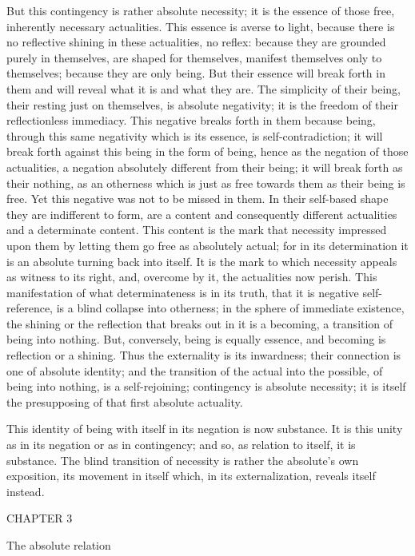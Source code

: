 But this contingency is rather absolute necessity;
it is the essence of those free, inherently necessary actualities.
This essence is averse to light,
because there is no reflective shining
in these actualities, no reflex:
because they are grounded purely in themselves,
are shaped for themselves,
manifest themselves only to themselves;
because they are only being.
But their essence will break forth in them
and will reveal what it is and what they are.
The simplicity of their being,
their resting just on themselves,
is absolute negativity;
it is the freedom of their reflectionless immediacy.
This negative breaks forth in them because being,
through this same negativity which is its essence,
is self-contradiction;
it will break forth against this
being in the form of being,
hence as the negation of those actualities,
a negation absolutely different from their being;
it will break forth as their nothing,
as an otherness which is just as free towards them
as their being is free.
Yet this negative was not to be missed in them.
In their self-based shape
they are indifferent to form,
are a content and consequently
different actualities
and a determinate content.
This content is the mark
that necessity impressed upon them
by letting them go free as absolutely actual;
for in its determination it is
an absolute turning back into itself.
It is the mark to which necessity appeals
as witness to its right,
and, overcome by it,
the actualities now perish.
This manifestation of what
determinateness is in its truth,
that it is negative self-reference,
is a blind collapse into otherness;
in the sphere of immediate existence,
the shining or the reflection
that breaks out in it is a becoming,
a transition of being into nothing.
But, conversely, being is equally essence,
and becoming is reflection or a shining.
Thus the externality is its inwardness;
their connection is one of absolute identity;
and the transition of the actual into the possible,
of being into nothing, is a self-rejoining;
contingency is absolute necessity;
it is itself the presupposing of that
first absolute actuality.

This identity of being with itself
in its negation is now substance.
It is this unity as in its negation
or as in contingency;
and so, as relation to itself, it is substance.
The blind transition of necessity is
rather the absolute's own exposition,
its movement in itself which, in its externalization,
reveals itself instead.

CHAPTER 3

The absolute relation

